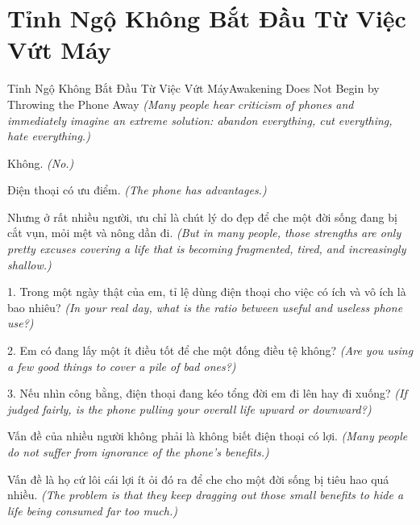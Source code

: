 \section{Tỉnh Ngộ Không Bắt Đầu Từ Việc Vứt Máy}
\begin{truyen}{Tỉnh Ngộ Không Bắt Đầu Từ Việc Vứt Máy}{Awakening Does Not Begin by Throwing the Phone Away}
\textit{(Many people hear criticism of phones and immediately imagine an extreme solution: abandon everything, cut everything, hate everything.)}

Không.
\textit{(No.)}

\end{truyen}

\begin{baihoc}
Điện thoại có ưu điểm.
\textit{(The phone has advantages.)}

Nhưng ở rất nhiều người, ưu chỉ là chút lý do đẹp để che một đời sống đang bị cắt vụn, mỏi mệt và nông dần đi.
\textit{(But in many people, those strengths are only pretty excuses covering a life that is becoming fragmented, tired, and increasingly shallow.)}
\end{baihoc}

\begin{tuhocnhanh}
1. Trong một ngày thật của em, tỉ lệ dùng điện thoại cho việc có ích và vô ích là bao nhiêu? \textit{(In your real day, what is the ratio between useful and useless phone use?)}

2. Em có đang lấy một ít điều tốt để che một đống điều tệ không? \textit{(Are you using a few good things to cover a pile of bad ones?)}

3. Nếu nhìn công bằng, điện thoại đang kéo tổng đời em đi lên hay đi xuống? \textit{(If judged fairly, is the phone pulling your overall life upward or downward?)}
\end{tuhocnhanh}

\begin{tongketchuong}
Vấn đề của nhiều người không phải là không biết điện thoại có lợi.
\textit{(Many people do not suffer from ignorance of the phone's benefits.)}

Vấn đề là họ cứ lôi cái lợi ít ỏi đó ra để che cho một đời sống bị tiêu hao quá nhiều.
\textit{(The problem is that they keep dragging out those small benefits to hide a life being consumed far too much.)}
\end{tongketchuong}

\ngancach